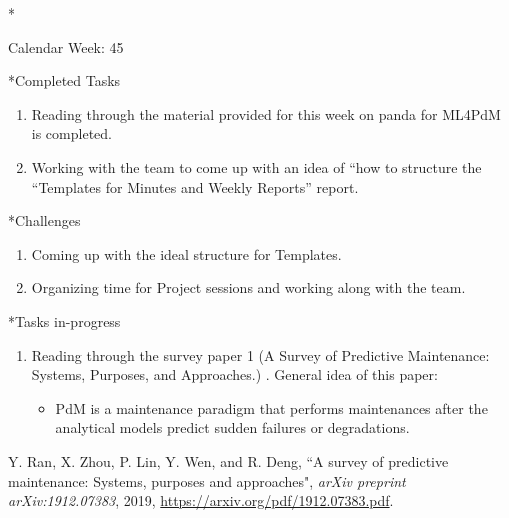 \documentclass[11pt,a4paper]{article}
\begin{document}
\newpage
\begin{section}*{Calendar Week: 45 \hfill \date{06 November, 2020}}

\begin{subsection}*{Completed Tasks}
    \begin{enumerate}
        \item
            Reading through the material provided for this week on panda for ML4PdM is completed.
        \item
            Working with the team to come up with an idea of “how to structure the “Templates for Minutes and Weekly Reports” report.
    \end{enumerate}
\end{subsection}

\begin{subsection}*{Challenges}
    \begin{enumerate}
        \item
            Coming up with the ideal structure for Templates.
        \item
            Organizing time for Project sessions and working along with the team.
    \end{enumerate}
\end{subsection}

\begin{subsection}*{Tasks in-progress}
    \begin{enumerate}
        \item
            Reading through the survey paper 1 (A Survey of Predictive Maintenance: Systems, Purposes, and Approaches.) \cite{survey1}. General idea of this paper:
            \begin{itemize}
                \item PdM is a maintenance paradigm that performs maintenances after the analytical models predict sudden failures or degradations.
            \end{itemize}
    \end{enumerate}
\end{subsection}

\begin{thebibliography}{9}
    {Y. Ran, X. Zhou, P. Lin, Y. Wen, and R. Deng},
    “A survey of predictive maintenance: Systems, purposes and approaches",
    \textit{arXiv preprint arXiv:1912.07383},
    2019,
    \href{https://arxiv.org/pdf/1912.07383.pdf}{https://arxiv.org/pdf/1912.07383.pdf}.
\end{thebibliography}
\end{section}
\end{document}
